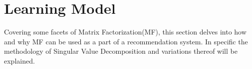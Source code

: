 \section{Learning Model}

Covering some facets of Matrix Factorization(MF), this section delves into how and why MF can be used as a part of a recommendation system. In specific the methodology of Singular Value Decomposition and variations thereof will be explained. 
%
%

